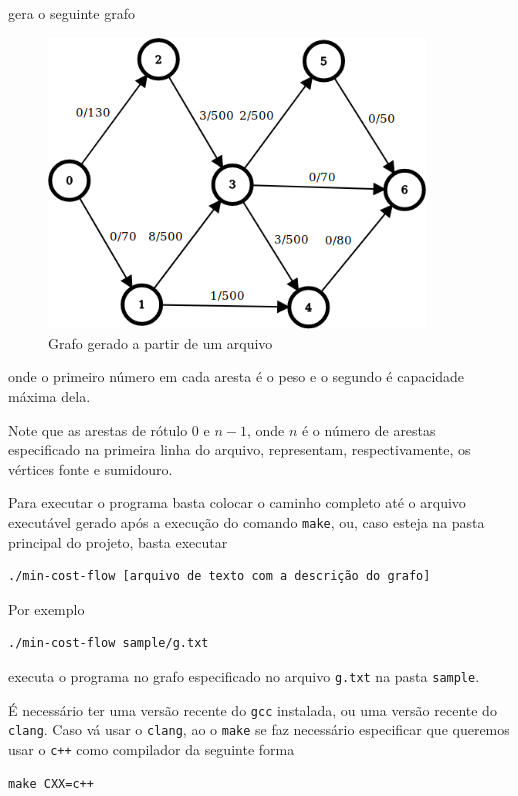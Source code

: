 \documentclass[12pt,a4]{article}
\begin{document}
\noindent gera o seguinte grafo

\begin{figure}[H]
  \centering
  \includegraphics[width=10cm]{alg-graph-example2.png}
  \caption{Grafo gerado a partir de um arquivo}
  \label{fig:alg-graph-example2}
\end{figure}

\noindent onde o primeiro número em cada aresta é o peso e o segundo é
capacidade máxima dela.

Note que as arestas de rótulo 0 e $n-1$, onde $n$ é o número de arestas
especificado na primeira linha do arquivo, representam, respectivamente, os
vértices fonte e sumidouro.

Para executar o programa basta colocar o caminho completo até o arquivo
executável gerado após a execução do comando \texttt{make}, ou, caso esteja na
pasta principal do projeto, basta executar

\begin{verbatim}
./min-cost-flow [arquivo de texto com a descrição do grafo]
\end{verbatim}

Por exemplo

\begin{verbatim}
./min-cost-flow sample/g.txt
\end{verbatim}

\noindent executa o programa no grafo especificado no arquivo \texttt{g.txt} na
pasta \texttt{sample}.

É necessário ter uma versão recente do \texttt{gcc} instalada, ou uma versão
recente do \texttt{clang}. Caso vá usar o \texttt{clang}, ao o \texttt{make} se
faz necessário especificar que queremos usar o \texttt{c++} como compilador da
seguinte forma

\begin{verbatim}
make CXX=c++
\end{verbatim}
\end{document}
